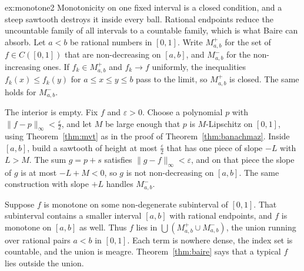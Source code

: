 \begin{solution}{ex:monotone2}
\idea Monotonicity on one fixed interval is a closed condition, and a steep sawtooth destroys it inside every ball. Rational endpoints reduce the uncountable family of all intervals to a countable family, which is what Baire can absorb.
\writeup Let $a<b$ be rational numbers in $[0,1]$. Write $M^+_{a,b}$ for the set of $f\in C([0,1])$ that are non-decreasing on $[a,b]$, and $M^-_{a,b}$ for the non-increasing ones. If $f_k\in M^+_{a,b}$ and $f_k\to f$ uniformly, the inequalities $f_k(x)\le f_k(y)$ for $a\le x\le y\le b$ pass to the limit, so $M^+_{a,b}$ is closed. The same holds for $M^-_{a,b}$.

The interior is empty. Fix $f$ and $\varepsilon>0$. Choose a polynomial $p$ with $\|f-p\|_\infty<\frac\varepsilon2$, and let $M$ be large enough that $p$ is $M$-Lipschitz on $[0,1]$, using Theorem~\ref{thm:mvt} as in the proof of Theorem~\ref{thm:banachmaz}. Inside $[a,b]$, build a sawtooth of height at most $\frac\varepsilon2$ that has one piece of slope $-L$ with $L>M$. The sum $g=p+s$ satisfies $\|g-f\|_\infty<\varepsilon$, and on that piece the slope of $g$ is at most $-L+M<0$, so $g$ is not non-decreasing on $[a,b]$. The same construction with slope $+L$ handles $M^-_{a,b}$.

Suppose $f$ is monotone on some non-degenerate subinterval of $[0,1]$. That subinterval contains a smaller interval $[a,b]$ with rational endpoints, and $f$ is monotone on $[a,b]$ as well. Thus $f$ lies in $\bigcup(M^+_{a,b}\cup M^-_{a,b})$, the union running over rational pairs $a<b$ in $[0,1]$. Each term is nowhere dense, the index set is countable, and the union is meagre. Theorem~\ref{thm:baire} says that a typical $f$ lies outside the union.
\end{solution}

